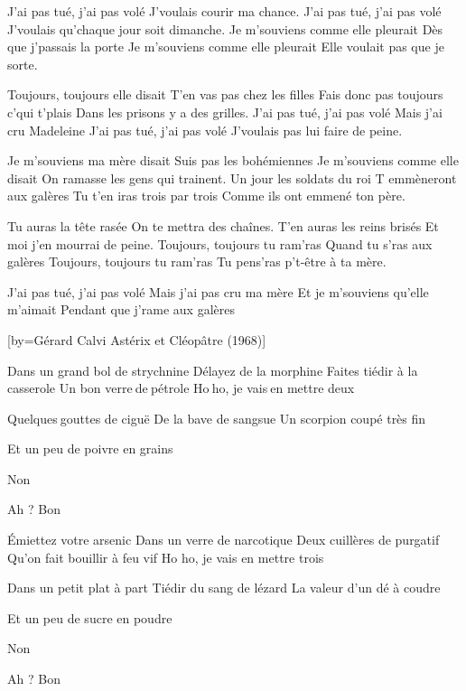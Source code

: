 \beginverse
J'ai pas tué, j'ai pas volé
J'voulais courir ma chance.
J'ai pas tué, j'ai pas volé
J'voulais qu'chaque jour soit dimanche.
Je m'souviens comme elle pleurait
Dès que j'passais la porte
Je m'souviens comme elle pleurait
Elle voulait pas que je sorte.
\endverse

\beginverse
Toujours, toujours elle disait
T'en vas pas chez les filles
Fais donc pas toujours c'qui t'plais
Dans les prisons y a des grilles.
J'ai pas tué, j'ai pas volé
Mais j'ai cru Madeleine 
J'ai pas tué, j'ai pas volé
J'voulais pas lui faire de peine.
\endverse

\beginverse
Je m'souviens ma mère disait
Suis pas les bohémiennes
Je m'souviens comme elle disait
On ramasse les gens qui trainent.
Un jour les soldats du roi
T emmèneront aux galères
Tu t'en iras trois par trois
Comme ils ont emmené ton père.
\endverse

\beginverse
Tu auras la tête rasée
On te mettra des chaînes.
T'en auras les reins brisés
Et moi j'en mourrai de peine.
Toujours, toujours tu ram'ras
Quand tu s'ras aux galères
Toujours, toujours tu ram'ras
Tu pens'ras p't-être à ta mère.
\endverse

\beginverse
J'ai pas tué, j'ai pas volé
Mais j'ai pas cru ma mère
Et je m'souviens qu'elle m'aimait
Pendant que j'rame aux galères
\endverse

[by={Gérard Calvi \- Astérix et Cléopâtre (1968)}]

\beginverse
Dans un grand bol de strychnine
Délayez de la morphine
Faites tiédir à la casserole
Un bon verre de pétrole
Ho ho, je vais en mettre deux
\endverse

\beginverse
Quelques gouttes de ciguë
De la bave de sangsue
Un scorpion coupé très fin
\endverse

\beginverse
Et un peu de poivre en grains \!
\endverse

\beginverse
Non \!
\endverse

\beginverse
Ah ? Bon
\endverse

\beginverse
Émiettez votre arsenic
Dans un verre de narcotique
Deux cuillères de purgatif
Qu'on fait bouillir à feu vif
Ho ho, je vais en mettre trois
\endverse

\beginverse
Dans un petit plat à part
Tiédir du sang de lézard
La valeur d'un dé à coudre
\endverse

\beginverse
Et un peu de sucre en poudre \!
\endverse

\beginverse
Non \!
\endverse

\beginverse
Ah ? Bon
\endverse

